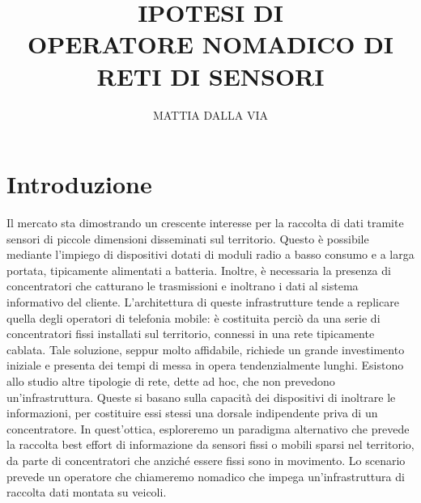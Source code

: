 \documentclass[a4paper,12pt]{article}
\title{\uppercase{\Large Ipotesi di\\ operatore nomadico di reti di sensori}}
\author{\uppercase{\normalsize Mattia Dalla Via}}
\theoremstyle{definition}
\begin{document}
\maketitle


\tableofcontents

\section{Introduzione}

Il mercato sta dimostrando un crescente interesse per la raccolta di dati tramite sensori di piccole dimensioni disseminati sul territorio. Questo è possibile mediante l'impiego di dispositivi dotati di moduli radio a basso consumo e a larga portata, tipicamente alimentati a batteria. Inoltre, è necessaria la presenza di concentratori che catturano le trasmissioni e inoltrano i dati al sistema informativo del cliente. L'architettura di queste infrastrutture tende a replicare quella degli operatori di telefonia mobile: è costituita perciò da una serie di concentratori fissi installati sul territorio, connessi in una rete tipicamente cablata. Tale soluzione, seppur molto affidabile, richiede un grande investimento iniziale e presenta dei tempi di messa in opera tendenzialmente lunghi. Esistono allo studio altre tipologie di rete, dette ad hoc, che non prevedono un'infrastruttura. Queste si basano sulla capacità dei dispositivi di inoltrare le informazioni, per costituire essi stessi una dorsale indipendente priva di un concentratore. In quest'ottica, esploreremo un paradigma alternativo che prevede la raccolta best effort di informazione da sensori fissi o mobili sparsi nel territorio, da parte di concentratori che anziché essere fissi sono in movimento. Lo scenario prevede un operatore che chiameremo nomadico che impega un'infrastruttura di raccolta dati montata su veicoli.



\end{document}
